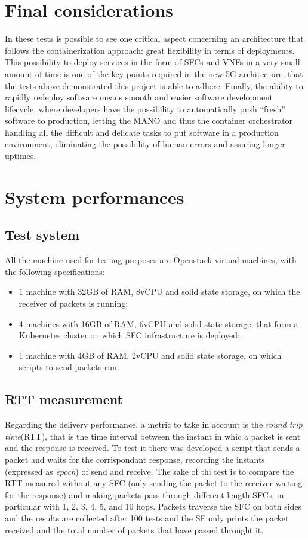 \section{Final considerations}

In these tests is possible to see one critical aspect concerning an architecture
that follows the containerization approach: great flexibility in terms of
deployments. This possibility to deploy services in the form of SFCs and VNFs in
a very small amount of time is one of the key points required in the new 5G
architecture, that the tests above demonstrated this project is able to adhere.
Finally, the ability to rapidly redeploy software means smooth and easier
software development lifecycle, where developers have the possibility to
automatically push ``fresh'' software to production, letting the MANO and thus
the container orchestrator handling all the difficult and delicate tasks to put
software in a production environment, eliminating the possibility of human
errors and assuring longer uptimes.

\section{System performances}

\subsection{Test system}
All the machine used for testing purposes are Openstack virtual machines, with the following specifications:
\begin{itemize}
\item 1 machine with 32GB of RAM, 8vCPU and solid state storage, on which the receiver of packets is running;
\item 4 machines with 16GB of RAM, 6vCPU and solid state storage, that form a Kubernetes cluster on which SFC infrastructure is deployed;
\item 1 machine with 4GB of RAM, 2vCPU and solid state storage, on which scripts to send packets run.
\end{itemize}

\subsection{RTT measurement}
Regarding the delivery performance, a metric to take in account is the \emph{round trip time}(RTT), that is the time interval between the instant in whic a packet is sent and the response is received. To test it there was developed a script that sends a packet and waits for the corrispondant response, recording the instants (expressed as \emph{epoch}) of send and receive. The sake of thi test is to compare the RTT measured without any SFC (only sending the packet to the receiver waiting for the response) and making packets pass through different length SFCs, in particular with 1, 2, 3, 4, 5, and 10 hops. Packets traverse the SFC on both sides and the results are collected after 100 tests and the SF only prints the packet received and the total number of packets that have passed throught it.

